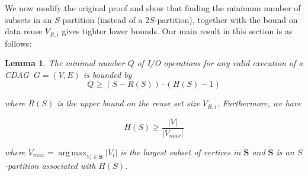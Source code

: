 \documentclass[sigplan,review,anonymous]{acmart}\settopmatter{printfolios=true,printccs=false,printacmref=false}
\newcommand\mac[1]{\textcolor{red}{[Mac: #1]}}
\DeclareMathOperator*{\argmax}{arg\,max}
\newtheorem{lma}{Lemma}
\begin{document}
We now modify the original proof and show that finding the minimum
number of subsets in an $S$-partition (instead of a $2S$-partition), together 
with the bound on data reuse $V_{R,i}$ gives
tighter lower bounds.
%
Our main result in this section is as follows:

\begin{lma}
%
The minimal number $Q$ of I/O operations for any valid execution of a CDAG 
$\ G=(V,E)$ is bounded by	
%
\begin{equation}
%
Q \ge (S - R(S)) \cdot (H(S) - 1)
%
\label{eq:reusebound} \end{equation}

\noindent
where $R(S)$ is the upper bound on the reuse set size $V_{R,i}$. Furthermore, 
we have

\begin{equation}\label{eq:reusebound-pmax}
H(S) \ge \frac{|V|}{|V_{max}|}
\end{equation}

\noindent
where $V_{max} = \argmax_{V_i \in \mathcal{\mathbf{S}}}|V_i|$ is the largest 
subset
of vertices in $\mathcal{\mathbf{S}}$ and $\mathcal{\mathbf{S}}$ is an
$S$-partition associated with $H(S)$.

% 
%
\end{lma}
\end{document}

